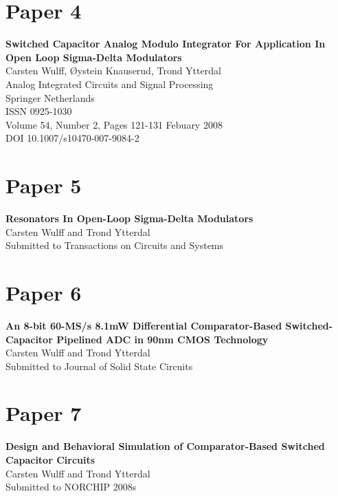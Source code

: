 \newpage

\section{Paper 4}
\textbf{\Large Switched Capacitor Analog Modulo Integrator For Application
  In Open Loop Sigma-Delta Modulators}\\
\indent Carsten Wulff, {\O}ystein Knauserud, Trond Ytterdal\\
\indent Analog Integrated Circuits and Signal Processing\\
\indent Springer Netherlands\\
\indent ISSN 0925-1030\\
\indent Volume 54, Number 2, Pages 121-131 Febuary 2008\\
\indent DOI 10.1007/s10470-007-9084-2

\newpage

\section{Paper 5}
\textbf{\Large Resonators In Open-Loop Sigma-Delta Modulators}\\
\indent Carsten Wulff and Trond Ytterdal\\
\indent Submitted to Transactions on Circuits and Systems\\

\newpage

\section{Paper 6}
\textbf{\Large An 8-bit 60-MS/s 8.1mW Differential Comparator-Based Switched-Capacitor
  Pipelined ADC in 90nm CMOS Technology}\\
\indent Carsten Wulff and Trond Ytterdal\\
\indent Submitted to Journal of Solid State Circuits\\

\newpage

\section{Paper 7}
\textbf{\Large Design and Behavioral Simulation of Comparator-Based Switched
  Capacitor Circuits}\\
\indent Carsten Wulff and Trond Ytterdal\\
\indent Submitted to NORCHIP 2008s\\


